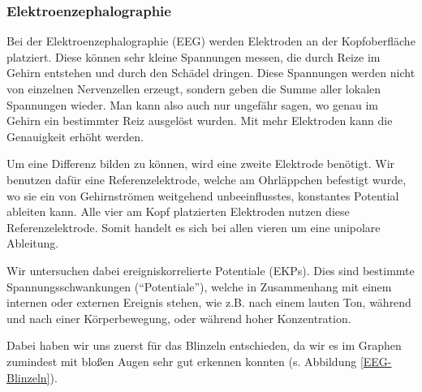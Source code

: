 \documentclass[11pt]{scrartcl}
\begin{document}
	\subsubsection{Elektroenzephalographie}

	Bei der Elektroenzephalographie (EEG) werden Elektroden an der Kopfoberfläche platziert. Diese können sehr kleine Spannungen messen, die durch Reize im Gehirn entstehen und durch den Schädel dringen. Diese Spannungen werden nicht von einzelnen Nervenzellen erzeugt, sondern geben die Summe aller lokalen Spannungen wieder. Man kann also auch nur ungefähr sagen, wo genau im Gehirn ein bestimmter Reiz ausgelöst wurden. Mit mehr Elektroden kann die Genauigkeit erhöht werden. \cite{wiki:EEG} \cite{Birbaumer2010}

	Um eine Differenz bilden zu können, wird eine zweite Elektrode benötigt. Wir benutzen dafür eine Referenzelektrode, welche am Ohrläppchen befestigt wurde, wo sie ein von Gehirnströmen weitgehend unbeeinflusstes, konstantes Potential ableiten kann. Alle vier am Kopf platzierten Elektroden nutzen diese Referenzelektrode. Somit handelt es sich bei allen vieren um eine unipolare Ableitung. \cite{Praktikum}

	Wir untersuchen dabei ereigniskorrelierte Potentiale (EKPs). Dies sind bestimmte Spannungsschwankungen (\enquote{Potentiale}), welche in Zusammenhang mit einem internen oder externen Ereignis stehen, wie z.B. nach einem lauten Ton, während und nach einer Körperbewegung, oder während hoher Konzentration. \cite{Birbaumer2010} \cite{Praktikum}

	Dabei haben wir uns zuerst für das Blinzeln entschieden, da wir es im Graphen zumindest mit bloßen Augen sehr gut erkennen konnten (s. Abbildung \ref{EEG-Blinzeln}).

	\begin{figure}[H]
	\end{figure}
\end{document}
